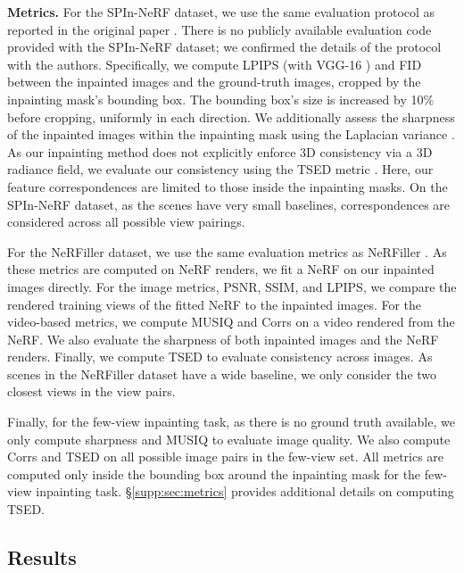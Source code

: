 \noindent\textbf{Metrics.} 
For the SPIn-NeRF dataset, we use the same evaluation 
protocol as reported in the original paper \cite{spinnerf}.
There is no publicly available evaluation code provided with the SPIn-NeRF dataset; we confirmed the details of the protocol with the authors.
Specifically, we compute LPIPS \cite{lpips} (with VGG-16 \cite{vgg}) and FID \cite{fid} between the inpainted images and the ground-truth images, cropped by the inpainting mask's bounding box. The bounding box's size is increased by 10\% before cropping, uniformly in each direction. We additionally assess the sharpness of the inpainted images within the inpainting mask using the Laplacian variance \cite{pertuz2013analysis}.
As our inpainting method does not explicitly enforce 3D consistency
via a 3D radiance field,
we evaluate our consistency using 
the TSED metric \cite{yu2023long}.
Here, our feature correspondences are limited to those inside the inpainting 
masks.
On the SPIn-NeRF dataset, as the scenes have very small baselines, correspondences are considered across all possible view pairings.

For the NeRFiller dataset, we use the same evaluation metrics as NeRFiller \cite{weber2024nerfiller}. As these metrics are computed on NeRF renders, we fit a NeRF on our inpainted images directly. For the image metrics, PSNR, SSIM, and LPIPS, we compare the rendered training views of the fitted NeRF to the inpainted images.
For the video-based metrics, we compute MUSIQ \cite{ke2021musiq} and Corrs on a video rendered from the NeRF. 
We also evaluate the sharpness of both inpainted images and the NeRF renders.
Finally, we compute TSED to evaluate consistency across images.
As scenes in the NeRFiller dataset have a wide baseline, we only consider the two closest views in the view pairs.

Finally, for the few-view inpainting task, as there is no ground truth available, we only compute sharpness and MUSIQ to evaluate image quality. We also compute Corrs and TSED on all possible image pairs in the few-view set. All metrics are computed only inside the bounding box around the inpainting mask for the few-view inpainting task. \S\ref{supp:sec:metrics} provides additional details on computing TSED.

\subsection{Results}

